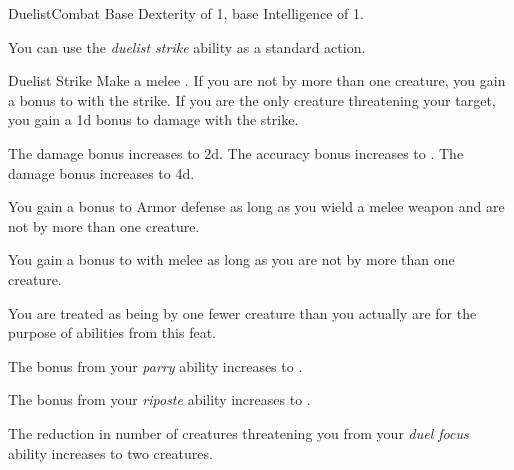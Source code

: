     \begin{feat}{Duelist}{Combat}
        \featpre Base Dexterity of 1, base Intelligence of 1.

         You can use the \textit{duelist strike} ability as a standard action.
        \begin{freeability}{Duelist Strike}
            Make a melee .
            If you are not  by more than one creature, you gain a  bonus to  with the strike.
            If you are the only creature threatening your target, you gain a \plus1d bonus to damage with the strike.

            \rankline
             The damage bonus increases to \plus2d.
             The accuracy bonus increases to .
             The damage bonus increases to \plus4d.
        \end{freeability}

         You gain a  bonus to Armor defense as long as you wield a melee weapon and are not  by more than one creature.

         You gain a  bonus to  with melee  as long as you are not  by more than one creature.

         You are treated as being  by one fewer creature than you actually are for the purpose of abilities from this feat.

         The bonus from your \textit{parry} ability increases to .

         The bonus from your \textit{riposte} ability increases to .

         The reduction in number of creatures threatening you from your \textit{duel focus} ability increases to two creatures.
    \end{feat}

